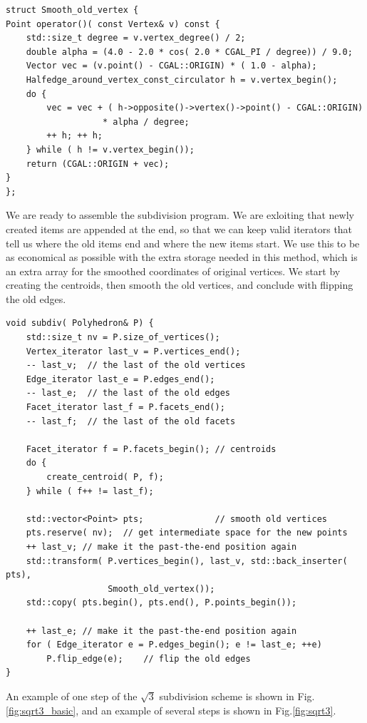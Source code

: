 \begin{lstlisting}
struct Smooth_old_vertex {
Point operator()( const Vertex& v) const {
    std::size_t degree = v.vertex_degree() / 2;
    double alpha = (4.0 - 2.0 * cos( 2.0 * CGAL_PI / degree)) / 9.0;
    Vector vec = (v.point() - CGAL::ORIGIN) * ( 1.0 - alpha);
    Halfedge_around_vertex_const_circulator h = v.vertex_begin();
    do {
        vec = vec + ( h->opposite()->vertex()->point() - CGAL::ORIGIN) 
                   * alpha / degree;
        ++ h; ++ h;
    } while ( h != v.vertex_begin());
    return (CGAL::ORIGIN + vec);
}
};
\end{lstlisting}

We are ready to assemble the subdivision program. We are exloiting
that newly created items are appended at the end, so that we can keep valid
iterators that tell us where the old items end and where the new items
start. We use this to be as economical as possible with the extra
storage needed in this method, which is an extra array for the
smoothed coordinates of original vertices. We start by creating the
centroids, then smooth the old vertices, and conclude with flipping
the old edges.

\begin{lstlisting}
void subdiv( Polyhedron& P) {
    std::size_t nv = P.size_of_vertices();
    Vertex_iterator last_v = P.vertices_end();
    -- last_v;  // the last of the old vertices
    Edge_iterator last_e = P.edges_end();
    -- last_e;  // the last of the old edges
    Facet_iterator last_f = P.facets_end();
    -- last_f;  // the last of the old facets

    Facet_iterator f = P.facets_begin(); // centroids
    do {
        create_centroid( P, f);
    } while ( f++ != last_f);

    std::vector<Point> pts;              // smooth old vertices
    pts.reserve( nv);  // get intermediate space for the new points
    ++ last_v; // make it the past-the-end position again
    std::transform( P.vertices_begin(), last_v, std::back_inserter( pts), 
                    Smooth_old_vertex());
    std::copy( pts.begin(), pts.end(), P.points_begin());

    ++ last_e; // make it the past-the-end position again
    for ( Edge_iterator e = P.edges_begin(); e != last_e; ++e)
        P.flip_edge(e);    // flip the old edges
}
\end{lstlisting}



An example of one step of
the $\sqrt{3}$ subdivision scheme is shown in
Fig.\ref{fig:sqrt3_basic}, and an example of several steps is shown in
Fig.\ref{fig:sqrt3}.

